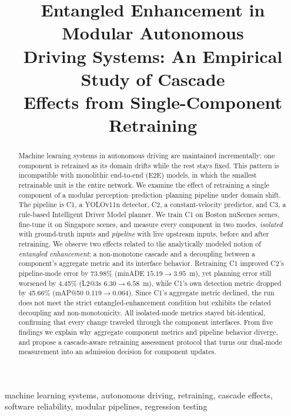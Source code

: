 \documentclass[conference]{IEEEtran}
\title{Entangled Enhancement in Modular Autonomous\\
Driving Systems: An Empirical Study of Cascade\\
Effects from Single-Component Retraining}
\author{\IEEEauthorblockN{Rashedul Arefin Ifty, Fumio Machida}
\IEEEauthorblockA{University of Tsukuba\\
Tsukuba, Japan\\
ifty.rashedul@sd.cs.tsukuba.ac.jp, machida@cs.tsukuba.ac.jp}}
\begin{document}
\maketitle

\begin{abstract}
Machine learning systems in autonomous driving are maintained incrementally:
one component is retrained as its domain drifts while the rest stays fixed.
This pattern is incompatible with monolithic end-to-end (E2E) models, in which
the smallest retrainable unit is the entire network. We examine the effect of
retraining a single component of a modular perception--prediction--planning
pipeline under domain shift. The pipeline is C1, a YOLOv11n detector, C2,
a constant-velocity predictor, and C3, a rule-based Intelligent Driver Model
planner. We train C1 on Boston nuScenes scenes, fine-tune it on Singapore
scenes, and measure every component in two modes, \emph{isolated} with
ground-truth inputs and \emph{pipeline} with live upstream inputs, before and
after retraining. We observe two effects related to the analytically modeled
notion of \emph{entangled enhancement}: a non-monotone cascade and a decoupling
between a component's aggregate metric and its interface behavior. Retraining
C1 improved C2's pipeline-mode error by 73.98\% (minADE $15.19 \to 3.95$~m),
yet planning error still worsened by 4.45\% (L2@3s $6.30 \to 6.58$~m), while
C1's own detection metric dropped by 45.66\% (mAP@50 $0.119 \to 0.064$). Since
C1's aggregate metric declined, the run does not meet the strict
entangled-enhancement condition but exhibits the related decoupling and
non-monotonicity. All isolated-mode metrics stayed bit-identical, confirming
that every change
traveled through the component interfaces. From five findings we explain why
aggregate component metrics and pipeline behavior diverge, and propose a
cascade-aware retraining assessment protocol that turns our dual-mode
measurement into an admission decision for component updates.
\end{abstract}

\begin{IEEEkeywords}
machine learning systems, autonomous driving, retraining, cascade effects,
software reliability, modular pipelines, regression testing
\end{IEEEkeywords}
\end{document}
